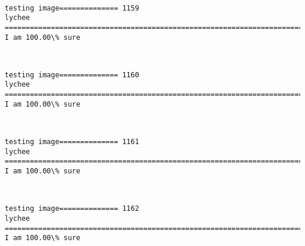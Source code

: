 \documentclass[11pt]{article}
\begin{document}
    \begin{center}
    \end{center}
    { \hspace*{\fill} \\}
    
    \begin{Verbatim}[commandchars=\\\{\}]
testing image============== 1159
lychee
============================================================================
I am 100.00\% sure

    \end{Verbatim}

    \begin{center}
    \end{center}
    { \hspace*{\fill} \\}
    
    \begin{Verbatim}[commandchars=\\\{\}]
testing image============== 1160
lychee
============================================================================
I am 100.00\% sure

    \end{Verbatim}

    \begin{center}
    \end{center}
    { \hspace*{\fill} \\}
    
    \begin{Verbatim}[commandchars=\\\{\}]
testing image============== 1161
lychee
============================================================================
I am 100.00\% sure

    \end{Verbatim}

    \begin{center}
    \end{center}
    { \hspace*{\fill} \\}
    
    \begin{Verbatim}[commandchars=\\\{\}]
testing image============== 1162
lychee
============================================================================
I am 100.00\% sure

    \end{Verbatim}
\end{document}
